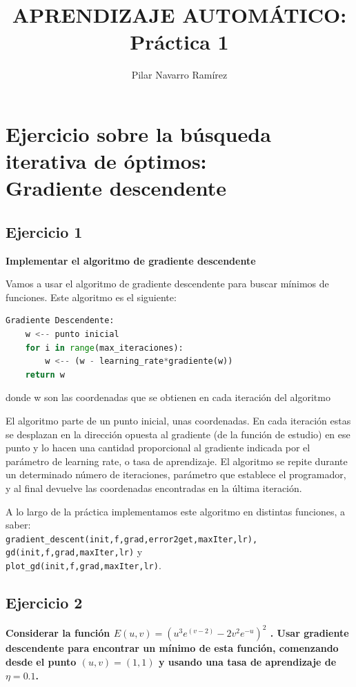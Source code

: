 \documentclass[a4]{article}
\author{Pilar Navarro Ramírez}
\date{\vspace{-5mm}}
\title{\huge APRENDIZAJE AUTOMÁTICO: Práctica 1 \HRule\vspace{-4mm}}
\begin{document}
\maketitle
\tableofcontents

\newpage

\section{Ejercicio sobre la búsqueda iterativa de óptimos:\\ Gradiente descendente}

\subsection{Ejercicio 1}
\textbf{Implementar el algoritmo de gradiente descendente}

Vamos a usar el algoritmo de gradiente descendente para buscar mínimos de funciones. Este algoritmo es el siguiente:

\begin{lstlisting}[language=Python]
Gradiente Descendente:
	w <-- punto inicial
	for i in range(max_iteraciones):
		w <-- (w - learning_rate*gradiente(w))
	return w
\end{lstlisting}
donde w son las coordenadas que se obtienen en cada iteración del algoritmo

El algoritmo parte de un punto inicial, unas coordenadas. En cada iteración estas se desplazan en la dirección opuesta al gradiente (de la función de estudio) en ese punto y lo hacen una cantidad proporcional al gradiente indicada por el parámetro de learning rate, o tasa de aprendizaje. El algoritmo se repite durante un determinado número de iteraciones, parámetro que establece el programador, y al final devuelve las coordenadas encontradas en la última iteración. 

A lo largo de la práctica implementamos este algoritmo en distintas funciones, a saber:\\ \lstinline{gradient_descent(init,f,grad,error2get,maxIter,lr), gd(init,f,grad,maxIter,lr)} y\\
\lstinline{plot_gd(init,f,grad,maxIter,lr)}.
\subsection{Ejercicio 2}
\textbf{Considerar la función $E(u, v) = (u^3e^{(v-2)} - 2v^2e^{-u} )^2$ . Usar gradiente descendente
para encontrar un mínimo de esta función, comenzando desde el punto $(u, v) = (1, 1)$ y
usando una tasa de aprendizaje de $\eta = 0.1$.}
\end{document}
